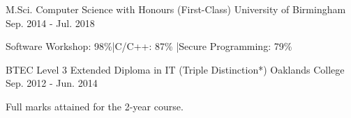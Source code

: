 

\begin{cventries}

  \cventry
  {M.Sci. Computer Science with Honours (First-Class)} %
    {University of Birmingham} %
    {} %
    {Sep. 2014 - Jul. 2018} %
    {
      \begin{cvitems}
      \item {Software Workshop: 98\%\hspace*{3mm}|\hspace*{3mm}C/C++: 87\%
        \hspace*{3mm}|\hspace*{3mm}Secure Programming: 79\%}
      \end{cvitems}
    }

  \cventry
  {BTEC Level 3 Extended Diploma in IT (Triple Distinction*)} %
    {Oaklands College} %
    {} %
    {Sep. 2012 - Jun. 2014} %
    {
      \begin{cvitems} %
        \item {Full marks attained for the 2-year course.}
      \end{cvitems}
    }

\end{cventries}
